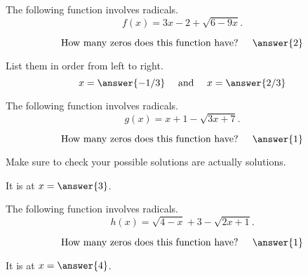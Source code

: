\documentclass{ximera}
\author{Carl Stitz \and Jeff Zeager \and  Bobby Ramsey}
\begin{document}
\licenseSZ



\begin{exercise}
	The following function involves radicals.
	$$ f(x) = 3x-2+\sqrt{6-9x}. $$
	
	$$ \text{How many zeros does this function have? } \quad \answer{2} $$
	\begin{exercise}
		List them in order from left to right.
		\[ x = \answer{-1/3}  \quad \text{ and } \quad x=\answer{2/3} \]
	\end{exercise}
\end{exercise}

\begin{exercise}
	The following function involves radicals.
	$$g(x) = x + 1 - \sqrt{3x+7}.$$
	
	$$ \text{How many zeros does this function have? } \quad \answer{1} $$
	\begin{hint}
		Make sure to check your possible solutions are actually solutions.
	\end{hint}
	\begin{exercise}
		It is at $x = \answer{3}$.
	\end{exercise}
\end{exercise}


\begin{exercise}
	The following function involves radicals.
	$$ h(x) = \sqrt{4-x}+3-\sqrt{2x+1}. $$

	$$ \text{How many zeros does this function have? } \quad \answer{1} $$
	\begin{exercise}
		It is at $x = \answer{4}$.
	\end{exercise}
\end{exercise}
\end{document}
